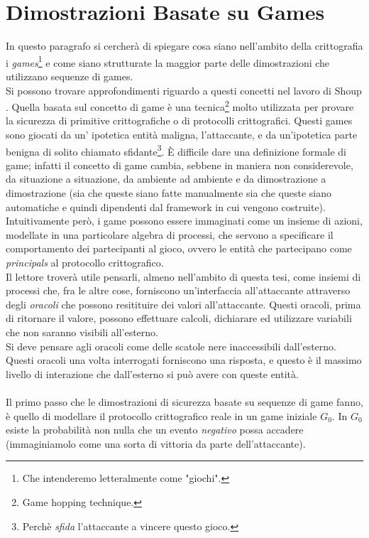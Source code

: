 \documentclass[a4paper,openright,twoside,12pt]{report}
\begin{document}
\section{Dimostrazioni Basate su Games}
In questo paragrafo si cercher\`a di spiegare cosa siano nell'ambito della crittografia i \emph{games}\footnote{Che intenderemo letteralmente come "giochi".} e come siano strutturate la
maggior parte delle dimostrazioni che utilizzano sequenze di games.\\Si possono trovare approfondimenti riguardo a questi concetti nel lavoro di Shoup \cite{shoup}.
Quella basata sul concetto di game \`e una tecnica\footnote{Game hopping technique.} molto utilizzata per provare la sicurezza di primitive crittografiche o di protocolli crittografici.
Questi games sono giocati da un' ipotetica entit\`a maligna, l'attaccante, e da un'ipotetica parte benigna di solito chiamato sfidante\footnote{Perch\`e \emph{sfida} l'attaccante a 
vincere questo gioco.}. 
\`E difficile dare una definizione formale di game; infatti il concetto di game cambia, sebbene in maniera non considerevole, da situazione a situazione, da ambiente ad ambiente e 
da dimostrazione a dimostrazione (sia che queste siano fatte manualmente sia che queste siano automatiche e quindi dipendenti dal framework in cui vengono costruite).
Intuitivamente per\`o, i game possono essere immaginati come un insieme di azioni, modellate in una particolare algebra di processi, 
che servono a specificare il comportamento dei partecipanti al gioco, ovvero le entit\`a che partecipano come \emph{principals} al protocollo crittografico.\\
Il lettore trover\`a utile pensarli, almeno nell'ambito di questa tesi, come insiemi di processi che, fra le altre cose, forniscono un'interfaccia all'attaccante attraverso degli 
\emph{oracoli} che possono resitituire dei valori all'attaccante. Questi oracoli, prima di ritornare il valore, possono effettuare calcoli, dichiarare ed utilizzare variabili che non saranno
visibili all'esterno.\\Si deve pensare agli oracoli come delle scatole nere inaccessibili dall'esterno. Questi oracoli una volta interrogati forniscono una risposta,
e questo \`e il massimo livello di interazione che dall'esterno si pu\`o avere con queste entit\`a.\\ \\
Il primo passo che le dimostrazioni di sicurezza basate su sequenze di game fanno, \`e quello di modellare il protocollo crittografico reale in un game iniziale $G_0$.
In $G_0$ esiste la probabilit\`a non nulla che un evento \emph{negativo} possa accadere (immaginiamolo come una sorta di vittoria da parte dell'attaccante).
\end{document}
